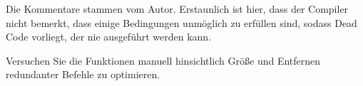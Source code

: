 



Die Kommentare stammen vom Autor. 
Erstaunlich ist hier, dass der Compiler nicht bemerkt, dass einige Bedingungen unmöglich zu erfüllen sind, sodass Dead
Code vorliegt, der nie ausgeführt werden kann.

\mysubparagraph{\Exercise}
Versuchen Sie die Funktionen manuell hinsichtlich Größe und Entfernen redundanter Befehle zu optimieren.
